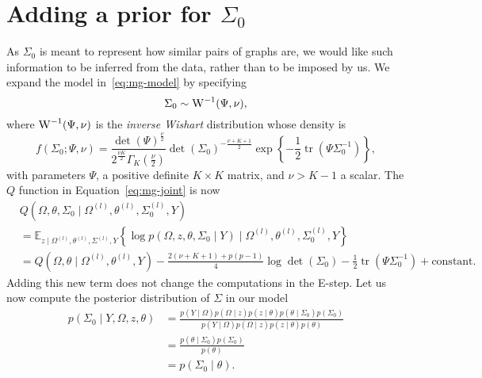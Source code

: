 \documentclass[a4paper, 11pt, oneside]{report}
\DeclareMathOperator{\tr}{tr}
\newcommand{\E}{\mathbb{E}}
\newcommand{\1}{\mathds{1}}
\newcommand{\powl}{^{(l)}}
\newcommand{\inv}{^{-1}}
\begin{document}
\section{Adding a prior for $\Sigma_0$} %
As $\Sigma_0$ is meant to represent how similar pairs of graphs are,
we would like such information to be inferred from the data, rather than to be imposed by us.
We expand the model in~\eqref{eq:mg-model} by specifying
\[\Sigma_0 \sim \textsc{W}\inv(\Psi, \nu),\]
where $\textsc{W}\inv(\Psi, \nu)$ is the \emph{inverse Wishart} distribution whose density is
\[f(\Sigma_0; \Psi, \nu) = \frac{\det(\Psi)^\frac{\nu}{2}}{2^\frac{\nu K}{2} \Gamma_K(\frac{\nu}{2})} \det(\Sigma_0)^{-\frac{\nu + K + 1}{2}} \exp\left\{-\frac{1}{2} \tr(\Psi \Sigma_0\inv)\right\},\]
with parameters $\Psi$, a positive definite $K \times K$ matrix, and $\nu > K - 1$ a scalar.
The $Q$ function in Equation~\eqref{eq:mg-joint} is now
\begin{align*}
	 & Q\left(\Omega, \theta, \Sigma_0 \mid \Omega\powl, \theta\powl, \Sigma_0\powl, Y\right)                                                                                         \\
	 & =  \E_{z \mid
		\Omega\powl, \theta\powl, \Sigma\powl, Y}\left\{\log
	p(\Omega,  z, \theta, \Sigma_0 \mid Y) \mid
	\Omega\powl, \theta\powl, \Sigma_0\powl, Y\right\}                                                                                                                                \\
	 & = Q\left(\Omega, \theta \mid \Omega\powl, \theta\powl, Y\right) - \frac{2(\nu + K + 1) + p(p-1)}{4} \log\det(\Sigma_0) - \frac{1}{2} \tr(\Psi \Sigma_0\inv) + \text{constant}.
\end{align*}
Adding this new term does not change the computations in the E-step. %
Let us now compute the posterior distribution of $\Sigma$ in our model
\begin{align*}
	p(\Sigma_0 \mid Y, \Omega, z, \theta) & = \frac{p(Y \mid \Omega) p(\Omega \mid z) p(z \mid \theta) p(\theta \mid \Sigma_0) p(\Sigma_0)}{p(Y \mid \Omega) p(\Omega \mid z) p(z \mid \theta) p(\theta)} \\
	                                      & = \frac{p(\theta \mid \Sigma_0) p(\Sigma_0)}{p(\theta)}                                                                                                       \\
	                                      & = p(\Sigma_0 \mid \theta).
\end{align*}
\end{document}
